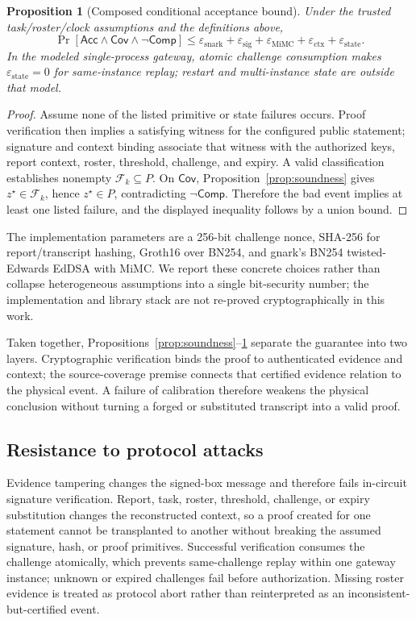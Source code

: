 \documentclass[preprint,review,12pt]{elsarticle}
\newtheorem{proposition}{Proposition}
\newcommand{\F}{\mathcal{F}_k}
\begin{document}
\begin{proposition}[Composed conditional acceptance bound]\label{prop:composition}
Under the trusted task/roster/clock assumptions and the definitions above,
\begin{equation}
 \Pr[\mathsf{Acc}\wedge\mathsf{Cov}\wedge\neg\mathsf{Comp}]
 \leq
 \varepsilon_{\mathrm{snark}}+
 \varepsilon_{\mathrm{sig}}+
 \varepsilon_{\mathrm{MiMC}}+
 \varepsilon_{\mathrm{ctx}}+
 \varepsilon_{\mathrm{state}}.
\end{equation}
In the modeled single-process gateway, atomic challenge consumption makes $\varepsilon_{\mathrm{state}}=0$ for same-instance replay; restart and multi-instance state are outside that model.
\end{proposition}
\begin{proof}
Assume none of the listed primitive or state failures occurs. Proof verification then implies a satisfying witness for the configured public statement; signature and context binding associate that witness with the authorized keys, report context, roster, threshold, challenge, and expiry. A valid classification establishes nonempty $\F\subseteq P$. On $\mathsf{Cov}$, Proposition~\ref{prop:soundness} gives $z^\star\in\F$, hence $z^\star\in P$, contradicting $\neg\mathsf{Comp}$. Therefore the bad event implies at least one listed failure, and the displayed inequality follows by a union bound.
\end{proof}

The implementation parameters are a 256-bit challenge nonce, SHA-256 for report/transcript hashing, Groth16 over BN254, and gnark's BN254 twisted-Edwards EdDSA with MiMC. We report these concrete choices rather than collapse heterogeneous assumptions into a single bit-security number; the implementation and library stack are not re-proved cryptographically in this work.

Taken together, Propositions~\ref{prop:soundness}--\ref{prop:composition} separate the guarantee into two layers. Cryptographic verification binds the proof to authenticated evidence and context; the source-coverage premise connects that certified evidence relation to the physical event. A failure of calibration therefore weakens the physical conclusion without turning a forged or substituted transcript into a valid proof.

\subsection{Resistance to protocol attacks}
Evidence tampering changes the signed-box message and therefore fails in-circuit signature verification. Report, task, roster, threshold, challenge, or expiry substitution changes the reconstructed context, so a proof created for one statement cannot be transplanted to another without breaking the assumed signature, hash, or proof primitives. Successful verification consumes the challenge atomically, which prevents same-challenge replay within one gateway instance; unknown or expired challenges fail before authorization. Missing roster evidence is treated as protocol abort rather than reinterpreted as an inconsistent-but-certified event.
\end{document}
